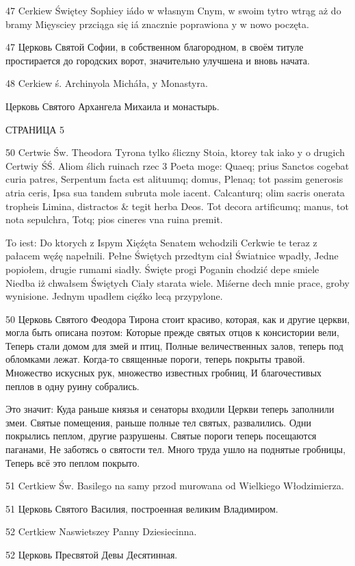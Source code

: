 47 Cerkiew Świętey Sophiey iádo w własnym Cnym, w swoim tytro wtrąg aż do bramy Mięysciey przciąga się iá znacznie poprawiona y w nowo poczęta.

47 Церковь Святой Софии, в собственном благородном, в своём титуле простирается до городских ворот, значительно улучшена и вновь начата.


48 Cerkiew ś. Archinyola Micháła, y Monastyra.

Церковь Святого Архангела Михаила и монастырь.

СТРАНИЦА 5


50 Certwie Św. Theodora Tyrona tylko śliczny Stoia, ktorey tak iako y o drugich Certwiy ŚŚ. Aliom ślich ruinach rzec 3 Poeta moge: Quaeq; prius Sanctos cogebat curia patres, Serpentum facta est alituumq; domus, Plenaq; tot passim generosis atria ceris, Ipsa sua tandem subruta mole iacent. Calcanturq; olim sacris onerata tropheis Limina, distractos \& tegit herba Deos. Tot decora artificumq; manus, tot nota sepulchra, Totq; pios cineres vna ruina premit.

To iest: Do ktorych z Ispym Xięźęta Senatem wchodzili Cerkwie te teraz z pałacem węźę napełnili. Pełne Świętych przedtym ciał Światnice wpadły, Jedne popiołem, drugie rumami siadły. Święte progi Poganin chodzić depe smiele Niedba iż chwałsem Świętych Ciały starata wiele. Miśerne dech mnie prace, groby wynisione. Jednym upadłem cięźko lecą przypylone.

50 Церковь Святого Феодора Тирона стоит красиво, которая, как и другие церкви, могла быть описана поэтом: Которые прежде святых отцов к консистории вели, Теперь стали домом для змей и птиц, Полные величественных залов, теперь под обломками лежат. Когда-то священные пороги, теперь покрыты травой. Множество искусных рук, множество известных гробниц, И благочестивых пеплов в одну руину собрались.

Это значит: Куда раньше князья и сенаторы входили Церкви теперь заполнили змеи. Святые помещения, раньше полные тел святых, развалились. Одни покрылись пеплом, другие разрушены. Святые пороги теперь посещаются паганами, Не заботясь о святости тел. Много труда ушло на поднятые гробницы, Теперь всё это пеплом покрыто.

51 Certkiew Św. Basilego na samy przod murowana od Wielkiego Włodzimierza.

51 Церковь Святого Василия, построенная великим Владимиром.

52 Certkiew Naswietszey Panny Dziesiecinna.

52 Церковь Пресвятой Девы Десятинная.

